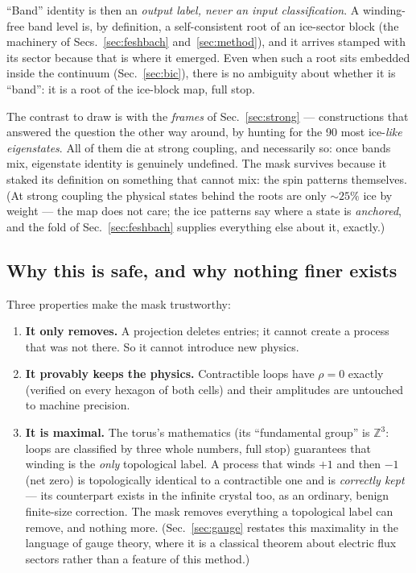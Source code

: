 \documentclass[11pt,a4paper]{article}
\begin{document}
``Band'' identity is then an \emph{output label, never an input
classification}.  A winding-free band level is, by definition, a
self-consistent root of an ice-sector block (the machinery of
Secs.~\ref{sec:feshbach} and~\ref{sec:method}), and it arrives stamped with
its sector because that is where it emerged.  Even when such a root sits
embedded inside the continuum (Sec.~\ref{sec:bic}), there is no ambiguity
about whether it is ``band'': it is a root of the ice-block map, full stop.

The contrast to draw is with the \emph{frames} of
Sec.~\ref{sec:strong} --- constructions that answered the question the
other way around, by hunting for the 90 most ice-\emph{like eigenstates}.
All of them die at strong coupling, and necessarily so: once bands mix,
eigenstate identity is genuinely undefined.  The mask survives because it
staked its definition on something that cannot mix: the spin patterns
themselves.  (At strong coupling the physical states behind the roots are
only $\sim25\%$ ice by weight --- the map does not care; the ice patterns
say where a state is \emph{anchored}, and the fold of
Sec.~\ref{sec:feshbach} supplies everything else about it, exactly.)

\subsection{Why this is safe, and why nothing finer exists}

Three properties make the mask trustworthy:

\begin{enumerate}
\item \textbf{It only removes.}  A projection deletes entries; it cannot
create a process that was not there.  So it cannot introduce new physics.
\item \textbf{It provably keeps the physics.}  Contractible loops have
$\rho=0$ exactly (verified on every hexagon of both cells) and their
amplitudes are untouched to machine precision.
\item \textbf{It is maximal.}  The torus's mathematics (its ``fundamental
group'' is $\mathbb{Z}^3$: loops are classified by three whole numbers, full
stop) guarantees that winding is the \emph{only} topological label.  A
process that winds $+1$ and then $-1$ (net zero) is topologically identical
to a contractible one and is \emph{correctly kept} --- its counterpart exists
in the infinite crystal too, as an ordinary, benign finite-size correction.
The mask removes everything a topological label can remove, and nothing more.
(Sec.~\ref{sec:gauge} restates this maximality in the language of gauge
theory, where it is a classical theorem about electric flux sectors rather
than a feature of this method.)
\end{enumerate}
\end{document}
